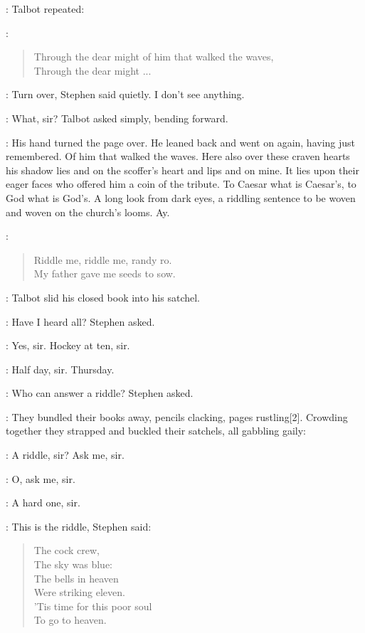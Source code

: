 :
Talbot repeated:

\talbot:
\begin{verse}
    Through the dear might of him that walked the waves, \\
    Through the dear might ...
\end{verse}

\Stephen:
Turn over, Stephen said quietly. I don't see anything.

\talbot:
What, sir? Talbot asked simply, bending forward.


:
His hand turned the page over. He leaned back and went on again,
having just remembered. Of him that walked the waves. Here also over
these craven hearts his shadow lies and on the scoffer's heart and lips
and on mine. It lies upon their eager faces who offered him a coin of the
tribute. To Caesar what is Caesar's, to God what is God's. A long look
from dark eyes, a riddling sentence to be woven and woven on the church's
looms. Ay.


\StephenInt:
\begin{verse}
    Riddle me, riddle me, randy ro. \\
    My father gave me seeds to sow.
\end{verse}

:
Talbot slid his closed book into his satchel.

\Stephen:
Have I heard all? Stephen asked.

\talbot:
Yes, sir. Hockey at ten, sir.

\armstrong:
Half day, sir. Thursday.

\Stephen:
Who can answer a riddle? Stephen asked.

:
They bundled their books away, pencils clacking, pages rustling[2].
Crowding together they strapped and buckled their satchels, all gabbling
gaily:

\comyn:
A riddle, sir? Ask me, sir.

\armstrong:
O, ask me, sir.

\cochrane:
A hard one, sir.

\Stephen:
This is the riddle, Stephen said:

\begin{verse}
    The cock crew, \\
    The sky was blue: \\
    The bells in heaven \\
    Were striking eleven. \\
    'Tis time for this poor soul \\
    To go to heaven.
\end{verse}

